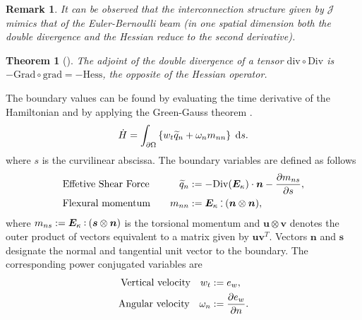 \documentclass[letterpaper, 10 pt, conference]{ieeeconf}
\newtheorem{theorem}{Theorem}
\newtheorem{remark}{Remark}
\def\onedot{$\mathsurround0pt\ldotp$}
\def\cddot{%
	\mathbin{\vcenter{\baselineskip.67ex
			\hbox{\onedot}\hbox{\onedot}}%
}}
\begin{document}
\begin{remark}
It can be observed that the interconnection structure given by $\mathcal{J}$ mimics that of the Euler-Bernoulli beam (in one spatial dimension both the double divergence and the Hessian reduce to the second derivative).
\end{remark}


\begin{theorem}[\cite{BrugnoliKir}]
	The adjoint of the double divergence of a tensor $\mathrm{div} \circ \mathrm{Div}$ is $ - \mathrm{Grad} \circ  \mathrm{grad} = - \mathrm{Hess}$, the opposite of the Hessian operator.
\end{theorem}

The boundary values can be found by evaluating the time derivative of the Hamiltonian and by applying the Green-Gauss theorem \cite{BrugnoliKir}.
\begin{equation}
\begin{aligned}
\dot{H}= \int_{\partial \Omega} \left\{ w_t \widetilde{q}_n  + \omega_n m_{nn}\right\} \d{s}.  \\
\end{aligned}
\end{equation}
where $s$ is the curvilinear abscissa. The boundary variables are defined as follows
\begin{equation}
\label{eq:QnMnnMns}
\begin{aligned}
&\text{Effetive Shear Force}  \quad &\widetilde{q}_{n} &:=  -\mathrm{Div}(\bm{E}_{\kappa}) \cdot \bm{n} - \diffp{m_{ns}}{s},  \\
&\text{Flexural momentum} \quad  &m_{nn} &:=   \bm{E}_{\kappa} \cddot (\bm{n}\otimes{\bm{n}}),	
\end{aligned}
\end{equation}
where $m_{ns} :=  \bm{E}_{\kappa} \cddot (\bm{s} \otimes{\bm{n}})$ is the torsional momentum and $\bm{u} \otimes {\bm{v}}$ denotes the outer product of vectors equivalent to a matrix given by $\bm{u}\bm{v}^T$. Vectors $\bm{n}$ and $\bm{s}$ designate the normal and tangential unit vector to the boundary. The corresponding power conjugated variables are
\begin{equation}
\label{eq:wtwnws}
\begin{aligned}
\text{Vertical velocity}  \quad w_t &:= e_w, \\
\text{Angular velocity} \quad \omega_{n} &:=  \diffp{e_w}{n}.
\end{aligned}
\end{equation}
\end{document}
